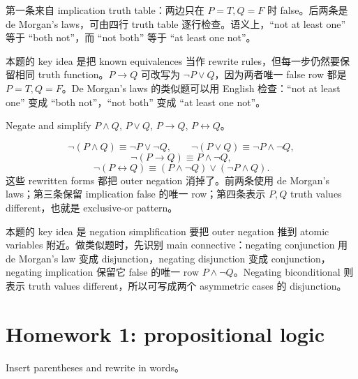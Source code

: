 \begin{solution}
第一条来自 implication truth table：两边只在 \(P=T,Q=F\) 时 false。后两条是 de Morgan's laws，可由四行 truth table 逐行检查。语义上，``not at least one'' 等于 ``both not''，而 ``not both'' 等于 ``at least one not''。
\end{solution}

\begin{explanation}
本题的 key idea 是把 known equivalences 当作 rewrite rules，但每一步仍然要保留相同 truth function。\(P\to Q\) 可改写为 \(\lnot P\lor Q\)，因为两者唯一 false row 都是 \(P=T,Q=F\)。De Morgan's laws 的类似题可以用 English 检查：``not at least one'' 变成 ``both not''，``not both'' 变成 ``at least one not''。
\end{explanation}

\begin{exerciseblock}
Negate and simplify \(P\land Q\), \(P\lor Q\), \(P\to Q\), \(P\leftrightarrow Q\)。
\end{exerciseblock}

\begin{solution}
\[
\lnot(P\land Q)\equiv\lnot P\lor\lnot Q,\qquad
\lnot(P\lor Q)\equiv\lnot P\land\lnot Q,
\]
\[
\lnot(P\to Q)\equiv P\land\lnot Q,
\]
\[
\lnot(P\leftrightarrow Q)\equiv(P\land\lnot Q)\lor(\lnot P\land Q).
\]
这些 rewritten forms 都把 outer negation 消掉了。前两条使用 de Morgan's laws；第三条保留 implication false 的唯一 row；第四条表示 \(P,Q\) truth values different，也就是 exclusive-or pattern。
\end{solution}

\begin{explanation}
本题的 key idea 是 negation simplification 要把 outer negation 推到 atomic variables 附近。做类似题时，先识别 main connective：negating conjunction 用 de Morgan's law 变成 disjunction，negating disjunction 变成 conjunction，negating implication 保留它 false 的唯一 row \(P\land\lnot Q\)。Negating biconditional 则表示 truth values different，所以可写成两个 asymmetric cases 的 disjunction。
\end{explanation}

\section{Homework 1: propositional logic}

\begin{exerciseblock}
Insert parentheses and rewrite in words。
\end{exerciseblock}


